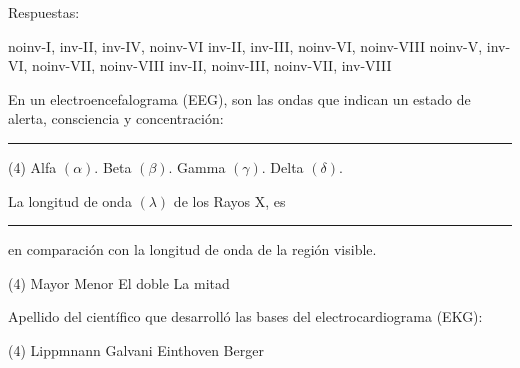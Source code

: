 \documentclass[12pt, letter]{exam}
\begin{document}
\begin{questions}
    \vspace{0.3cm}
    Respuestas:
    \begin{tasks}
        \task noinv-I, inv-II, inv-IV, noinv-VI
        \task inv-II, inv-III, noinv-VI, noinv-VIII
        \task noinv-V, inv-VI, noinv-VII, noinv-VIII
        \task inv-II, noinv-III, noinv-VII, inv-VIII
    \end{tasks}
    \question En un electroencefalograma (EEG), son las ondas que indican un estado de alerta, consciencia y concentración: \rule{2cm}{0.1mm}
    \begin{tasks}(4)
        \task Alfa $(\alpha)$.
        \task Beta $(\beta)$.
        \task Gamma $(\gamma)$.
        \task Delta $(\delta)$.
    \end{tasks}
    \question La longitud de onda $(\lambda)$ de los Rayos X, es \rule{2cm}{0.1mm} en comparación con la longitud de onda de la región visible.
    \begin{tasks}(4)
        \task Mayor
        \task Menor
        \task El doble
        \task La mitad
    \end{tasks}
    \question Apellido del científico que desarrolló las bases del electrocardiograma (EKG):
    \begin{tasks}(4)
        \task Lippmnann
        \task Galvani
        \task Einthoven
        \task Berger
    \end{tasks}

    

\end{questions}

\end{document}
